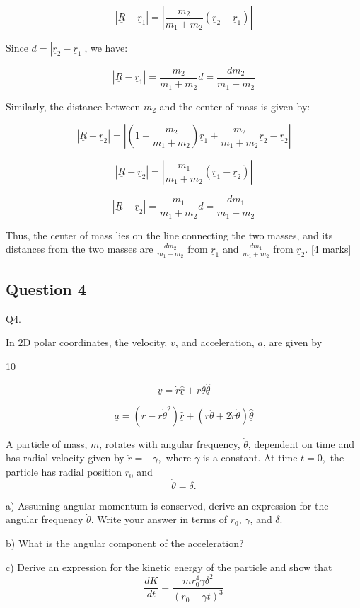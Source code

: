 \documentclass{article}
\begin{document}
$$|\underline{R} - \underline{r}_1| = \left| \frac{m_2}{m_1 + m_2}(\underline{r}_2 - \underline{r}_1) \right|$$

Since $d = |\underline{r}_2 - \underline{r}_1|$, we have:

$$|\underline{R} - \underline{r}_1| = \frac{m_2}{m_1 + m_2} d = \frac{dm_2}{m_1+m_2}$$

Similarly, the distance between $m_2$ and the center of mass is given by:

$$|\underline{R} - \underline{r}_2| = \left| \left(1 - \frac{m_2}{m_1 + m_2}\right)\underline{r}_1 + \frac{m_2}{m_1 + m_2}\underline{r}_2 - \underline{r}_2 \right|$$

$$|\underline{R} - \underline{r}_2| = \left| \frac{m_1}{m_1 + m_2}(\underline{r}_1 - \underline{r}_2) \right|$$

$$|\underline{R} - \underline{r}_2| = \frac{m_1}{m_1 + m_2} d = \frac{dm_1}{m_1+m_2}$$

Thus, the center of mass lies on the line connecting the two masses, and its distances from the two masses are $\frac{dm_2}{m_1+m_2}$ from $\underline{r}_1$ and $\frac{dm_1}{m_1+m_2}$ from $\underline{r}_2$. [4 marks]

\subsection{Question 4}
Q4.

    In 2D polar coordinates, the velocity, $\underline{v}$, and acceleration, $\underline{a}$, are given by 
    
    10

    \[\underline{v}=\dot{r}\underline{\hat{r}}+r\dot{\theta}\underline{\hat{\theta}}\]

    \[\underline{a}=(\ddot{r}-r\dot{\theta}^{2})\underline{\hat{r}}+(r\ddot{\theta}+2\dot{r}\dot{\theta})\underline{\hat{\theta}}\]

A particle of mass, $m$, rotates with angular frequency, $\dot{\theta}$, dependent on time and has radial velocity
given by $\dot{r}=-\gamma,$ where $\gamma$ is a constant. At time $t=0,$ the particle has radial position $r_{0}$ and
\[\dot{\theta}=\delta.\]

a) Assuming angular momentum is conserved, derive an expression for the angular frequency $\dot{\theta}$.
Write your answer in terms of $r_{0}$, $\gamma$, and $\delta$.

b) What is the angular component of the acceleration?

c) Derive an expression for the kinetic energy of the particle and show that
\[\frac{dK}{dt}=\frac{mr_{0}^{4}\gamma\delta^{2}}{(r_{0}-\gamma t)^{3}}\]
\end{document}
